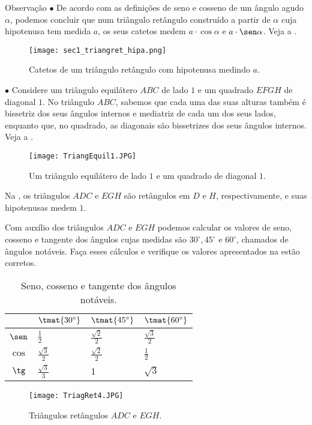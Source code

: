 \begin{observationtitle}{Observação}
        $\bullet$ De acordo com as definições de seno e cosseno de um ângulo agudo $\alpha$, podemos concluir que num triângulo retângulo construído a partir de $\alpha$ cuja hipotenusa tem medida $a$, os seus catetos medem $a\cdot\cos\alpha$  e $a\cdot\sen\alpha$. Veja a .
    
    \begin{figure}[H]
    \centering
    \texttt{[image: sec1\_triangret\_hipa.png]}
    \caption{Catetos de um triângulo retângulo com hipotenusa medindo $a$.}
    \label{TriagRet3}
\end{figure}

$\bullet$ Considere um triângulo equilátero $ABC$ de lado $1$ e um quadrado $EFGH$ de diagonal $1$. No triângulo $ABC$, sabemos que cada uma das suas alturas também é bissetriz  dos seus ângulos internos e mediatriz de cada um dos seus lados, enquanto que, no quadrado, as diagonais são bissetrizes dos seus ângulos internos. Veja a .

\begin{figure}[H]
    \centering
    \texttt{[image: TriangEquil1.JPG]}
    \caption{Um triângulo equilátero de lado $1$ e um quadrado de diagonal $1$.}
    \label{TriangEquil1}
\end{figure}

Na , os  triângulos $ADC$ e $EGH$ são retângulos em $D$ e $H$, respectivamente, e suas hipotenusas medem $1$.

Com auxílio dos triângulos $ADC$ e $EGH$ podemos calcular os valores de seno, cosseno e tangente dos ângulos cujas medidas são $30^\circ, 45^\circ$ e $60^\circ$, chamados de ângulos notáveis. Faça esses cálculos e verifique os valores apresentados na  estão corretos.

\begin{table}[H]
\centering
\begin{tabular}{|c|e{1cm}|e{1cm}|e{1cm}|}
\hline
\tcolor{} &  $\tmat{30^\circ}$ &  $\tmat{45^\circ}$ & $\tmat{60^\circ}$ \tabularnewline 
\hline
$\sen$   & $\frac{1}{2}$ & $\frac{\sqrt{2}}{2}$ & $\frac{\sqrt{3}}{2}$ \tabularnewline
\hline
$\cos$   & $\frac{\sqrt{3}}{2}$ & $\frac{\sqrt{2}}{2}$ & $\frac{1}{2}$ \tabularnewline 
\hline
$\tg$   & $\frac{\sqrt{3}}{3}$ & $1$ & $\sqrt{3}$ \tabularnewline
\hline
\end{tabular}
\caption{Seno, cosseno e tangente dos ângulos notáveis.}
\label{table_angulosnotaveis}
\end{table}

\begin{figure}[H]
    \centering
    \texttt{[image: TriagRet4.JPG]}
    \caption{Triângulos retângulos $ADC$ e $EGH$.}
    \label{TriagRet4}
\end{figure}
\end{observationtitle}
    
